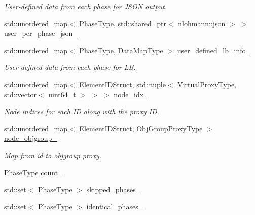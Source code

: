 \begin{DoxyCompactItemize}
\begin{DoxyCompactList}\small\item\em User-\/defined data from each phase for J\+S\+ON output. \end{DoxyCompactList}\item 
std\+::unordered\+\_\+map$<$ \hyperlink{namespacevt_a46ce6733d5cdbd735d561b7b4029f6d7}{Phase\+Type}, std\+::shared\+\_\+ptr$<$ nlohmann\+::json $>$ $>$ \hyperlink{structvt_1_1vrt_1_1collection_1_1balance_1_1_l_b_data_holder_aa4b11a094d2f858d29e4a91d61942ddf}{user\+\_\+per\+\_\+phase\+\_\+json\+\_\+}
\item 
std\+::unordered\+\_\+map$<$ \hyperlink{namespacevt_a46ce6733d5cdbd735d561b7b4029f6d7}{Phase\+Type}, \hyperlink{namespacevt_1_1vrt_1_1collection_1_1balance_acf152c668ed9e2e9c6b29784181d2435}{Data\+Map\+Type} $>$ \hyperlink{structvt_1_1vrt_1_1collection_1_1balance_1_1_l_b_data_holder_ad5b8a5a6093c4edd34a10069551c1d19}{user\+\_\+defined\+\_\+lb\+\_\+info\+\_\+}
\begin{DoxyCompactList}\small\item\em User-\/defined data from each phase for LB. \end{DoxyCompactList}\item 
std\+::unordered\+\_\+map$<$ \hyperlink{namespacevt_1_1vrt_1_1collection_1_1balance_a9f5b53fafb270212279a4757d2c4cd28}{Element\+I\+D\+Struct}, std\+::tuple$<$ \hyperlink{namespacevt_a1b417dd5d684f045bb58a0ede70045ac}{Virtual\+Proxy\+Type}, std\+::vector$<$ uint64\+\_\+t $>$ $>$ $>$ \hyperlink{structvt_1_1vrt_1_1collection_1_1balance_1_1_l_b_data_holder_a6b316a4e35ea98e592cbe875074aa6d8}{node\+\_\+idx\+\_\+}
\begin{DoxyCompactList}\small\item\em Node indices for each ID along with the proxy ID. \end{DoxyCompactList}\item 
std\+::unordered\+\_\+map$<$ \hyperlink{namespacevt_1_1vrt_1_1collection_1_1balance_a9f5b53fafb270212279a4757d2c4cd28}{Element\+I\+D\+Struct}, \hyperlink{namespacevt_ad7cae989df485fccca57f0792a880a8e}{Obj\+Group\+Proxy\+Type} $>$ \hyperlink{structvt_1_1vrt_1_1collection_1_1balance_1_1_l_b_data_holder_ab862d2f1b884256fc88634757f37bb80}{node\+\_\+objgroup\+\_\+}
\begin{DoxyCompactList}\small\item\em Map from id to objgroup proxy. \end{DoxyCompactList}\item 
\hyperlink{namespacevt_a46ce6733d5cdbd735d561b7b4029f6d7}{Phase\+Type} \hyperlink{structvt_1_1vrt_1_1collection_1_1balance_1_1_l_b_data_holder_ac7d4f40440b458c101af292dd3357558}{count\+\_\+}
\item 
std\+::set$<$ \hyperlink{namespacevt_a46ce6733d5cdbd735d561b7b4029f6d7}{Phase\+Type} $>$ \hyperlink{structvt_1_1vrt_1_1collection_1_1balance_1_1_l_b_data_holder_a66a5410c689d1515c9462495d3225a79}{skipped\+\_\+phases\+\_\+}
\item 
std\+::set$<$ \hyperlink{namespacevt_a46ce6733d5cdbd735d561b7b4029f6d7}{Phase\+Type} $>$ \hyperlink{structvt_1_1vrt_1_1collection_1_1balance_1_1_l_b_data_holder_a190018ee0726acb12d7d416476de5bfd}{identical\+\_\+phases\+\_\+}
\end{DoxyCompactItemize}
